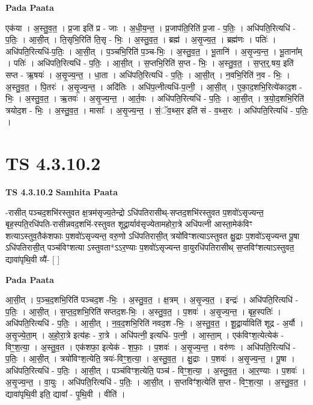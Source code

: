 \documentclass[17pt]{extarticle}
\begin{document}
\textbf{Pada Paata} \newline

एक॑या । अ॒स्तु॒व॒त॒ । प्र॒जा इति॑ प्र - जाः । अ॒धी॒य॒न्त॒ । प्र॒जाप॑ति॒रिति॑ प्र॒जा - प॒तिः॒ । अधि॑पति॒रित्यधि॑ - प॒तिः॒ । आ॒सी॒त् । ति॒सृभि॒रिति॑ ति॒सृ - भिः॒ । अ॒स्तु॒व॒त॒ । ब्रह्म॑ । अ॒सृ॒ज्य॒त॒ । ब्रह्म॑णः । पतिः॑ । अधि॑पति॒रित्यधि॑-प॒तिः॒ । आ॒सी॒त् । प॒ञ्चभि॒रिति॑ प॒ञ्च-भिः॒ । अ॒स्तु॒व॒त॒ । भू॒तानि॑ । अ॒सृ॒ज्य॒न्त॒ । भू॒ताना᳚म् । पतिः॑ । अधि॑पति॒रित्यधि॑ - प॒तिः॒ । आ॒सी॒त् । स॒प्तभि॒रिति॑ स॒प्त - भिः॒ । अ॒स्तु॒व॒त॒ । स॒प्त॒र्॒.षय॒ इति॑ सप्त - ऋ॒षयः॑ । अ॒सृ॒ज्य॒न्त॒ । धा॒ता । अधि॑पति॒रित्यधि॑ - प॒तिः॒ । आ॒सी॒त् । न॒वभि॒रिति॑ न॒व - भिः॒ । अ॒स्तु॒व॒त॒ । पि॒तरः॑ । अ॒सृ॒ज्य॒न्त॒ । अदि॑तिः । अधि॑प॒त्नीत्यधि॑-प॒त्नी॒ । आ॒सी॒त् । ए॒का॒द॒शभि॒रित्ये॑काद॒श - भिः॒ । अ॒स्तु॒व॒त॒ । ऋ॒तवः॑ । अ॒सृ॒ज्य॒न्त॒ । आ॒र्त॒वः । अधि॑पति॒रित्यधि॑ - प॒तिः॒ । आ॒सी॒त् । त्र॒यो॒द॒शभि॒रिति॑ त्रयोद॒श - भिः॒ । अ॒स्तु॒व॒त॒ । मासाः᳚ । अ॒सृ॒ज्य॒न्त॒ । सं॒ॅव॒थ्स॒र इति॑ सं - व॒थ्स॒रः । अधि॑पति॒रित्यधि॑ - प॒तिः॒ ।  \newline




\section*{ TS 4.3.10.2 }

\textbf{TS 4.3.10.2 } \newline
\textbf{Samhita Paata} \newline

-रासीत् पञ्चद॒शभि॑रस्तुवत क्ष॒त्रम॑सृज्य॒तेन्द्रो ऽधि॑पतिरासीथ्-सप्तद॒शभि॑रस्तुवत प॒शवो॑ऽसृज्यन्त॒ बृह॒स्पति॒रधि॑पति-रासीन्नवद॒शभि॑-रस्तुवत शूद्रा॒र्याव॑सृज्येतामहोरा॒त्रे अधि॑पत्नी आस्ता॒मेक॑विꣳ शत्याऽस्तुव॒तैक॑शफाः प॒शवो॑ऽसृज्यन्त॒ वरु॒णो ऽधि॑पतिरासी॒त् त्रयो॑विꣳशत्याऽस्तुवत क्षु॒द्राः प॒शवो॑ऽसृज्यन्त पू॒षा ऽधि॑पतिरासी॒त् पञ्च॑विꣳशत्या ऽस्तुवता*ऽऽर॒ण्याः प॒शवो॑ऽसृज्यन्त वा॒युरधि॑पतिरासीथ् स॒प्तविꣳ॑शत्याऽस्तुवत॒ द्यावा॑पृथि॒वी व्यै॑- [  ] \newline

\textbf{Pada Paata} \newline

आ॒सी॒त् । प॒ञ्च॒द॒शभि॒रिति॑ पञ्चद॒श -भिः॒ । अ॒स्तु॒व॒त॒ । क्ष॒त्रम् । अ॒सृ॒ज्य॒त॒ । इन्द्रः॑ । अधि॑पति॒रित्यधि॑ - प॒तिः॒ । आ॒सी॒त् । स॒प्त॒द॒शभि॒रिति॑ सप्तद॒श-भिः॒ । अ॒स्तु॒व॒त॒ । प॒शवः॑ । अ॒सृ॒ज्य॒न्त॒ । बृह॒स्पतिः॑ । अधि॑पति॒रित्यधि॑ - प॒तिः॒ । आ॒सी॒त् । न॒व॒द॒शभि॒रिति॑ नवद॒श -भिः॒ । अ॒स्तु॒व॒त॒ । शू॒द्रा॒र्याविति॑ शूद्र - अ॒र्यौ । अ॒सृ॒ज्ये॒ता॒म् । अ॒हो॒रा॒त्रे इत्य॑हः - रा॒त्रे । अधि॑पत्नी॒ इत्यधि॑- प॒त्नी॒ । आ॒स्ता॒म् । एक॑विꣳश॒त्येत्येक॑ - विꣳ॒॒श॒त्या॒ । अ॒स्तु॒व॒त । एक॑शफा॒ इत्येक॑ - श॒फाः॒ । प॒शवः॑ । अ॒सृ॒ज्य॒न्त॒ । वरु॑णः । अधि॑पति॒रित्यधि॑ - प॒तिः॒ । आ॒सी॒त् । त्रयो॑विꣳश॒त्येति॒ त्रयः॑-विꣳ॒॒श॒त्या॒ । अ॒स्तु॒व॒त॒ । क्षु॒द्राः । प॒शवः॑ । अ॒सृ॒ज्य॒न्त॒ । पू॒षा । अधि॑पति॒रित्यधि॑ - प॒तिः॒ । आ॒सी॒त् । पञ्च॑विꣳश॒त्येति॒ पञ्च॑ - विꣳ॒॒श॒त्या॒ । अ॒स्तु॒व॒त॒ । आ॒र॒ण्याः । प॒शवः॑ । अ॒सृ॒ज्य॒न्त॒ । वा॒युः । अधि॑पति॒रित्यधि॑ - प॒तिः॒ । आ॒सी॒त् । स॒प्तविꣳ॑श॒त्येति॑ स॒प्त - विꣳ॒॒श॒त्या॒ । अ॒स्तु॒व॒त॒ । द्यावा॑पृथि॒वी इति॒ द्यावा᳚ - पृ॒थि॒वी । वीति॑ ।  \newline
\end{document}
